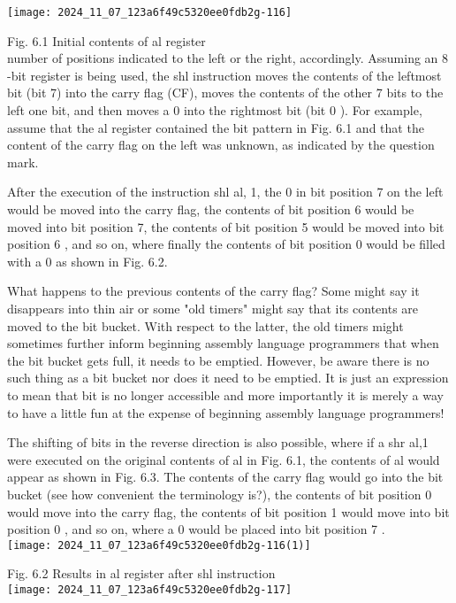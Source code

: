 \documentclass[10pt]{article}
\begin{document}
\begin{center}
\texttt{[image: 2024\_11\_07\_123a6f49c5320ee0fdb2g-116]}
\end{center}

Fig. 6.1 Initial contents of al register\\
number of positions indicated to the left or the right, accordingly. Assuming an 8 -bit register is being used, the shl instruction moves the contents of the leftmost bit (bit 7) into the carry flag (CF), moves the contents of the other 7 bits to the left one bit, and then moves a 0 into the rightmost bit (bit 0 ). For example, assume that the al register contained the bit pattern in Fig. 6.1 and that the content of the carry flag on the left was unknown, as indicated by the question mark.

After the execution of the instruction shl al, 1, the 0 in bit position 7 on the left would be moved into the carry flag, the contents of bit position 6 would be moved into bit position 7, the contents of bit position 5 would be moved into bit position 6 , and so on, where finally the contents of bit position 0 would be filled with a 0 as shown in Fig. 6.2.

What happens to the previous contents of the carry flag? Some might say it disappears into thin air or some "old timers" might say that its contents are moved to the bit bucket. With respect to the latter, the old timers might sometimes further inform beginning assembly language programmers that when the bit bucket gets full, it needs to be emptied. However, be aware there is no such thing as a bit bucket nor does it need to be emptied. It is just an expression to mean that bit is no longer accessible and more importantly it is merely a way to have a little fun at the expense of beginning assembly language programmers!

The shifting of bits in the reverse direction is also possible, where if a shr al,1 were executed on the original contents of al in Fig. 6.1, the contents of al would appear as shown in Fig. 6.3. The contents of the carry flag would go into the bit bucket (see how convenient the terminology is?), the contents of bit position 0 would move into the carry flag, the contents of bit position 1 would move into bit position 0 , and so on, where a 0 would be placed into bit position 7 .\\
\texttt{[image: 2024\_11\_07\_123a6f49c5320ee0fdb2g-116(1)]}

Fig. 6.2 Results in al register after shl instruction\\
\texttt{[image: 2024\_11\_07\_123a6f49c5320ee0fdb2g-117]}
\end{document}

